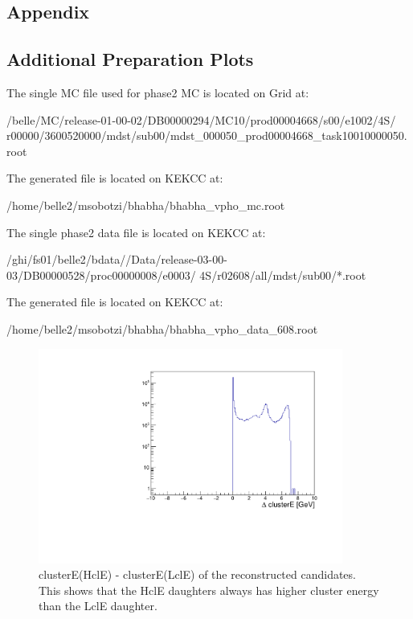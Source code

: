 \documentclass[a4paper,11pt,twosided,final,german,openbib,pdftex,listof=totoc,bibliography=totoc]{scrbook}
\begin{document}
\begin{appendix}
	

\chapter{Appendix}
	
	
\section{Additional Preparation Plots}


The single MC file used for phase2 MC is located on Grid at:
\newline 

/belle/MC/release-01-00-02/DB00000294/MC10/prod00004668/s00/e1002/4S/
r00000/3600520000/mdst/sub00/mdst\_000050\_prod00004668\_task10010000050.root
\newline

The generated file is located on KEKCC at:
\newline

/home/belle2/msobotzi/bhabha/bhabha\_vpho\_mc.root
\newline

The single phase2 data file is located on KEKCC at:
\newline

/ghi/fs01/belle2/bdata//Data/release-03-00-03/DB00000528/proc00000008/e0003/
4S/r02608/all/mdst/sub00/*.root
\newline

The generated file is located on KEKCC at:
\newline

/home/belle2/msobotzi/bhabha/bhabha\_vpho\_data\_608.root
\newline


\begin{figure}[h!]
	\centering
	\includegraphics[width=10cm]{AnhangPlots/clEDiff.pdf}
	\caption[clusterE(HclE) - clusterE(LclE)]{clusterE(HclE) - clusterE(LclE) of the reconstructed candidates. This shows that the HclE daughters always has higher cluster energy than the LclE daughter.}
	\label{fig:clEDiff}
\end{figure}








\end{appendix}
\end{document}
